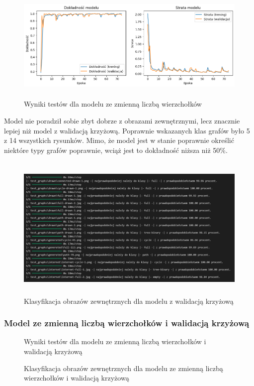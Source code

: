 \begin{figure}[ht]
	\centering
	\includegraphics[height=5.5cm]{resources/tests/images/v2_multiple_edges_epoch75.png}
	\caption{Wyniki testów dla modelu ze zmienną liczbą wierzchołków}
	\label{Fig:tests-var-1}
\end{figure}
\FloatBarrier

Model nie poradził sobie zbyt dobrze z obrazami zewnętrznymi, lecz znacznie lepiej niż model z walidacją krzyżową.
Poprawnie wskazanych klas grafów było 5 z 14 wszystkich rysunków.
Mimo, że model jest w stanie poprawnie określić niektóre typy grafów poprawnie,
wciąż jest to dokładność niższa niż 50\%.

\begin{figure}[ht]
	\centering
	\includegraphics[height=7cm]{resources/tests/images/v2_multiple_edges_epoch75_img_tests.png}
	\caption{Klasyfikacja obrazów zewnętrznych dla modelu z walidacją krzyżową}
	\label{Fig:tests-var-2}
\end{figure}
\FloatBarrier

\subsubsection{Model ze zmienną liczbą wierzchołków i walidacją krzyżową}

\begin{figure}[ht]
	\centering
	\caption{Wyniki testów dla modelu ze zmienną liczbą wierzchołków i walidacją krzyżową}
	\label{Fig:tests-csvar-1}
\end{figure}
\FloatBarrier

\begin{figure}[ht]
	\centering
	\caption{Klasyfikacja obrazów zewnętrznych dla modelu ze zmienną liczbą wierzchołków i walidacją krzyżową}
	\label{Fig:tests-csvar-2}
\end{figure}
\FloatBarrier